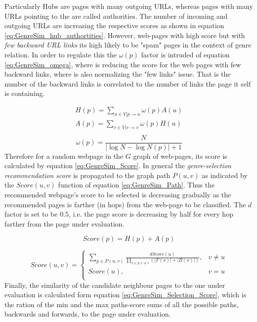 Particularly Hubs are pages with many outgoing URLs, whereas pages with many URLs pointing to the are called authorities. The number of incoming and outgoing URLs are increasing the respective scores as shown in equation \ref{eq:GenreSim_hub_authortities}. However, web-pages with high score but with \textit{few backward URL links} its high likely to be "spam" pages in the context of genre relation. In order to regulate this the $\omega(p)$ factor is intruded of equation \ref{eq:GenreSim_omega}, where is reducing the score for the web pages with few backward links, where is also normalizing the "few links" issue. That is the number of the backward links is correlated to the number of links the page it self is containing. 

\begin{equation}\label{eq:GenreSim_hub_authortities}
	\begin{array}{l}
		H(p) = \sum_{u \in V|p \to u} \omega(p) A(u) \\  
    	A(p) = \sum_{v \in V|v \to v} \omega(p) H(u) \\
    \end{array}
\end{equation}
\begin{equation}\label{eq:GenreSim_omega}
	\omega(p) = \frac{N}{|\log N - \log N(p) | + 1} 
\end{equation}
Therefore for a random webpage in the $G$ graph of web-pages, its score is calculated by equation \ref{eq:GenreSim_Score}. In general the \textit{genre-selection recommendation score} is propagated to the graph path $P(u,v)$ as indicated by the $Score(u, v)$ function of equation \ref{eq:GenreSim_Path}. Thus the recommended webpage's score to be selected is decreasing gradually as the recommended pages is farther (in hops) from the web-page to be classified. The $d$ factor is set to be $0.5$, i.e. the page score is decreasing by half for every hop farther from the page under evaluation. 

\begin{equation}\label{eq:GenreSim_Score}
	Score(p) = H(p) + A(p)
\end{equation}

\begin{equation}\label{eq:GenreSim_Path}
	Score(u, v) =
      \begin{cases}
      	\sum_{p \in P(u, v)} \frac{d Score(u)}{\prod_{x \in p, x  \neq v} (|F(x)| +|B(x)|)}, & v \neq u \\
        Score(u), & v = u \\ 
       \end{cases}
\end{equation}
Finally, the similarity of the candidate neighbour pages to the one under evaluation is calculated form equation \ref{eq:GenreSim_Selection_Score}, which is the ration of the min and the max paths-score sums of all the possible paths, backwards and forwards, to the page under evaluation.

